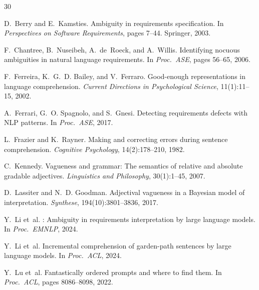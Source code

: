 \documentclass[11pt,a4paper]{article}
\begin{document}
\begin{thebibliography}{30}

D.~Berry and E.~Kamsties.
\newblock Ambiguity in requirements specification.
\newblock In \emph{Perspectives on Software Requirements}, pages 7--44. Springer, 2003.

F.~Chantree, B.~Nuseibeh, A.~de~Roeck, and A.~Willis.
\newblock Identifying nocuous ambiguities in natural language requirements.
\newblock In \emph{Proc.\ ASE}, pages 56--65, 2006.

F.~Ferreira, K.~G.~D. Bailey, and V.~Ferraro.
\newblock Good-enough representations in language comprehension.
\newblock \emph{Current Directions in Psychological Science}, 11(1):11--15, 2002.

A.~Ferrari, G.~O. Spagnolo, and S.~Gnesi.
\newblock Detecting requirements defects with NLP patterns.
\newblock In \emph{Proc.\ ASE}, 2017.

L.~Frazier and K.~Rayner.
\newblock Making and correcting errors during sentence comprehension.
\newblock \emph{Cognitive Psychology}, 14(2):178--210, 1982.

C.~Kennedy.
\newblock Vagueness and grammar: The semantics of relative and absolute gradable adjectives.
\newblock \emph{Linguistics and Philosophy}, 30(1):1--45, 2007.

D.~Lassiter and N.~D. Goodman.
\newblock Adjectival vagueness in a Bayesian model of interpretation.
\newblock \emph{Synthese}, 194(10):3801--3836, 2017.

Y.~Li et~al.
: Ambiguity in requirements interpretation by large language models.
\newblock In \emph{Proc.\ EMNLP}, 2024.

Y.~Li et~al.
\newblock Incremental comprehension of garden-path sentences by large language models.
\newblock In \emph{Proc.\ ACL}, 2024.

Y.~Lu et~al.
\newblock Fantastically ordered prompts and where to find them.
\newblock In \emph{Proc.\ ACL}, pages 8086--8098, 2022.


\end{thebibliography}
\end{document}
